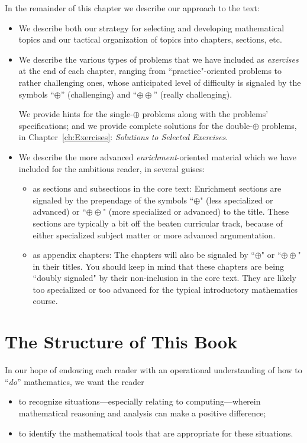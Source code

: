 \bigskip

In the remainder of this chapter we describe our approach to the text:
\begin{itemize}
\item
We describe both our strategy for selecting and developing mathematical topics and our tactical organization of topics into chapters, sections, etc. 
\medskip\item
We describe the various types of problems that we have included as {\em exercises} at the end of each chapter, ranging from ``practice"-oriented problems to rather challenging ones, whose anticipated level of difficulty is signaled by the symbols ``$\oplus$'' (challenging) and ``$\oplus \oplus$'' (really challenging).

\smallskip

We provide hints for the single-$\oplus$ problems along with the problems' specifications; and we provide complete solutions for the double-$\oplus$ problems, in Chapter~\ref{ch:Exercises}: {\it Solutions to Selected Exercises}.
\medskip\item
We describe the more advanced {\em enrichment}-oriented material which we have included for the ambitious reader, in several guises:
  \begin{itemize}
  \item
as sections and subsections in the core text: Enrichment sections are signaled by the prependage of the symbols ``$\oplus$" (less specialized or advanced) or ``$\oplus \oplus$" (more specialized or advanced) to the title.  These sections are typically a bit off the beaten curricular track, because of either specialized subject matter or more advanced argumentation.
\medskip\item
as appendix chapters: The chapters will also be signaled by ``$\oplus$" or ``$\oplus \oplus$" in their titles.  You should keep in mind that these chapters are being ``doubly signaled" by their non-inclusion in the core text.  They are likely too specialized or too advanced for the typical introductory mathematics course.
  \end{itemize}
\end{itemize}

\section{The Structure of This Book}
\label{sec:thisbook}

In our hope of endowing each reader with an operational understanding of how to ``{\em do}'' mathematics, we want the reader
\begin{itemize}
\item
to recognize situations---especially relating to computing---wherein mathematical reasoning and analysis can make a positive difference;
\medskip\item
to identify the mathematical tools that are appropriate for these situations.
\end{itemize}



